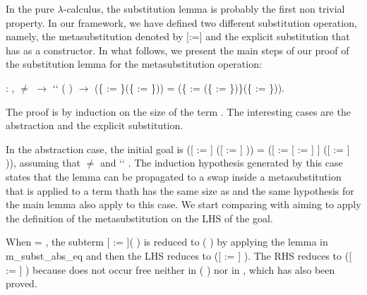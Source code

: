  In the pure $\lambda$-calculus, the substitution lemma is probably the first non trivial property. In our framework, we have defined two different substitution operation, namely, the metasubstitution denoted by [:=] and the explicit substitution that has  as a constructor. In what follows, we present the main steps of our proof of the substitution lemma for the metasubstitution operation: 
\begin{coqdoccode}
\coqdocemptyline
\coqdocnoindent
{} : \coqdockw{\ensuremath{\forall}}     ,  \ensuremath{\not=}  \ensuremath{\rightarrow}  `` ( ) \ensuremath{\rightarrow} (\{ := \}(\{ := \})) = (\{ := (\{ := \})\}(\{ := \})).\coqdoceol
\end{coqdoccode}
 The proof is by induction on the size of the term . The interesting cases are the abstraction and the explicit substitution.
\begin{coqdoccode}
\end{coqdoccode}
In the abstraction case, the initial goal is ([ := ] ([ := ]   )) = ([ := [ := ] ] ([ := ]   )), assuming that  \ensuremath{\not=}  and  ``  . The induction hypothesis generated by this case states that the lemma can be propagated to a swap inside a metasubstitution that is applied to a term thath has the same size as  and the same hypothesis for the main lemma also apply to this case. We start comparing  with  aiming to apply the definition of the metasubstitution on the LHS of the goal.
\begin{coqdoccode}
\end{coqdoccode}
When  = , the subterm [ := ](  ) is reduced to (  ) by applying the lemma in m\_subst\_abs\_eq and then the LHS reduces to ([ := ]   ). The RHS reduces to ([ := ]   ) because  does not occur free neither in (  ) nor in , which has also been proved.
